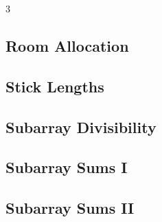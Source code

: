 \documentclass[8pt]{extarticle}
\begin{document}
\begin{multicols*}{3}
\subsection{Room Allocation}
\begin{caixaenunciado}

\end{caixaenunciado}
\vspace{0.3cm}


\subsection{Stick Lengths}
\begin{caixaenunciado}

\end{caixaenunciado}
\vspace{0.3cm}


\subsection{Subarray Divisibility}
\begin{caixaenunciado}

\end{caixaenunciado}
\vspace{0.3cm}


\subsection{Subarray Sums I}
\begin{caixaenunciado}

\end{caixaenunciado}
\vspace{0.3cm}


\subsection{Subarray Sums II}
\begin{caixaenunciado}

\end{caixaenunciado}
\vspace{0.3cm}



\end{multicols*}
\end{document}
